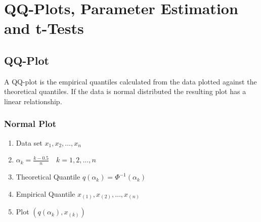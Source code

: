 \documentclass[11pt]{article}
\theoremstyle{definition}
\begin{document}
\section{QQ-Plots, Parameter Estimation and t-Tests}

\subsection{QQ-Plot}

A QQ-plot is the empirical quantiles calculated from the data plotted against the theoretical quantiles. If the data is normal distributed the resulting plot has a linear relationship.

\subsubsection{Normal Plot}
\begin{enumerate}[label=(\arabic*)]
	\item Data set $x_1,x_2,\dots, x_n$
	\item $\alpha_k = \frac{k-0.5}{n}\quad k=1,2,\dots,n$
	\item Theoretical Quantile $q(\alpha_k) = \Phi^{-1}(\alpha_k)$
	\item Empirical Quantile $x_{(1)}, x_{(2)},\dots, x_{(n)}$
	\item Plot $\left( q(\alpha_k), x_{(k)} \right)$
\end{enumerate}
\end{document}

